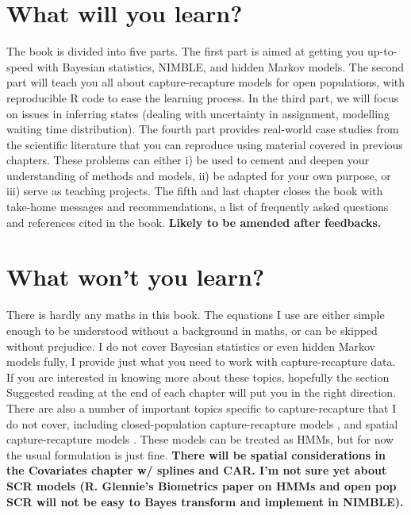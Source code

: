 \documentclass[
  12pt,
]{krantz}
\begin{document}
\hypertarget{what-will-you-learn}{%
\section*{What will you learn?}\label{what-will-you-learn}}


The book is divided into five parts. The first part is aimed at getting you up-to-speed with Bayesian statistics, NIMBLE, and hidden Markov models. The second part will teach you all about capture-recapture models for open populations, with reproducible R code to ease the learning process. In the third part, we will focus on issues in inferring states (dealing with uncertainty in assignment, modelling waiting time distribution). The fourth part provides real-world case studies from the scientific literature that you can reproduce using material covered in previous chapters. These problems can either i) be used to cement and deepen your understanding of methods and models, ii) be adapted for your own purpose, or iii) serve as teaching projects. The fifth and last chapter closes the book with take-home messages and recommendations, a list of frequently asked questions and references cited in the book. \textbf{Likely to be amended after feedbacks.}

\hypertarget{what-wont-you-learn}{%
\section*{What won't you learn?}\label{what-wont-you-learn}}


There is hardly any maths in this book. The equations I use are either simple enough to be understood without a background in maths, or can be skipped without prejudice. I do not cover Bayesian statistics or even hidden Markov models fully, I provide just what you need to work with capture-recapture data. If you are interested in knowing more about these topics, hopefully the section Suggested reading at the end of each chapter will put you in the right direction. There are also a number of important topics specific to capture-recapture that I do not cover, including closed-population capture-recapture models \citep{WilliamsEtAl2002}, and spatial capture-recapture models \citep{RoyleEtAl2013book}. These models can be treated as HMMs, but for now the usual formulation is just fine. \textbf{There will be spatial considerations in the Covariates chapter w/ splines and CAR. I'm not sure yet about SCR models (R. Glennie's Biometrics paper on HMMs and open pop SCR will not be easy to Bayes transform and implement in NIMBLE).}
\end{document}
